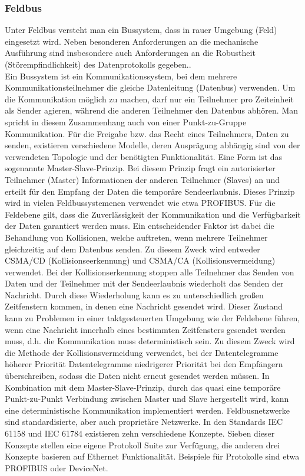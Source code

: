 \subsubsection{Feldbus}
\glqq Unter Feldbus versteht man ein Bussystem, dass in rauer Umgebung (Feld) eingesetzt wird. Neben besonderen Anforderungen an die mechanische Ausführung sind insbesondere auch Anforderungen an die Robustheit (Störempfindlichkeit) des Datenprotokolls gegeben.\grqq \citep{Gutekunst2017}. \\ %
Ein Bussystem ist ein Kommunikationssystem, bei dem mehrere Kommunikationsteilnehmer die gleiche Datenleitung (Datenbus) verwenden. Um die Kommunikation möglich zu machen, darf nur ein Teilnehmer pro Zeiteinheit als Sender agieren, während die anderen Teilnehmer den Datenbus abhören. Man spricht in diesem Zusammenhang auch von einer Punkt-zu-Gruppe Kommunikation\citep{Gutekunst2017}. %
Für die Freigabe bzw. das Recht eines Teilnehmers, Daten zu senden, existieren verschiedene Modelle, deren Ausprägung abhängig sind von der verwendeten Topologie und der benötigten Funktionalität. Eine Form ist das sogenannte Master-Slave-Prinzip. Bei diesem Prinzip fragt ein autorisierter Teilnehmer (Master) Informationen der anderen Teilnehmer (Slaves) an und erteilt für den Empfang der Daten die temporäre Sendeerlaubnis. Dieses Prinzip wird in vielen Feldbussystemenen verwendet wie etwa PROFIBUS\citep{Gutekunst2017}. 
Für die Feldebene gilt, dass die Zuverlässigkeit der Kommunikation und die Verfügbarkeit der Daten garantiert werden muss. Ein entscheidender Faktor ist dabei die Behandlung von Kollisionen, welche auftreten, wenn mehrere Teilnehmer gleichzeitig auf dem Datenbus senden. Zu diesem Zweck wird entweder CSMA/CD (Kollisionseerkennung) und CSMA/CA (Kollisionsvermeidung) verwendet. Bei der Kollisionserkennung stoppen alle Teilnehmer das Senden von Daten und der Teilnehmer mit der Sendeerlaubnis wiederholt das Senden der Nachricht. Durch diese Wiederholung kann es zu unterschiedlich großen Zeitfenstern kommen, in denen eine Nachricht gesendet wird. Dieser Zustand kann zu Problemen in einer taktgesteuerten Umgebung wie der Feldebene führen, wenn eine Nachricht innerhalb eines bestimmten Zeitfensters gesendet werden muss, d.h. die Kommunikation muss \glqq deterministisch\grqq{} sein. Zu diesem Zweck wird die Methode der Kollisionsvermeidung verwendet, bei der Datentelegramme höherer Priorität Datentelegramme niedrigerer Priorität bei den Empfängern überschreiben, sodass die Daten nicht erneut gesendet werden müssen. In Kombination mit dem Master-Slave-Prinzip, durch das quasi eine temporäre Punkt-zu-Punkt Verbindung zwischen Master und Slave hergestellt wird, kann eine deterministische Kommunikation implementiert werden\citep{Gutekunst2017}.
Feldbusnetzwerke sind standardisierte, aber auch proprietäre Netzwerke. In den Standards IEC 61158 und IEC 61784 existieren zehn verschiedene Konzepte. Sieben dieser Konzepte stellen eine eigene Protokoll Suite zur Verfügung, die anderen drei Konzepte basieren auf Ethernet Funktionalität. Beispiele für Protokolle sind etwa PROFIBUS oder DeviceNet.



